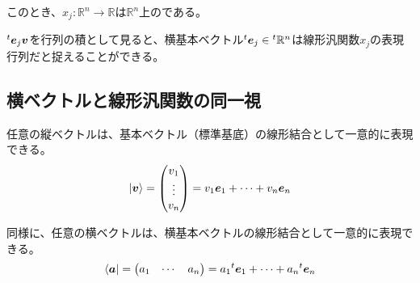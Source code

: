 \documentclass[../../../topic_linear-algebra]{subfiles}
\begin{document}
このとき、$x_j\colon \mathbb{R}^n \to \mathbb{R}$は$\mathbb{R}^n$上のである。

${}^t\vb*{e}_j \vb*{v}$を行列の積として見ると、横基本ベクトル${}^t\vb*{e}_j \in {}^t\mathbb{R}^n$は線形汎関数$x_j$の表現行列だと捉えることができる。

\begin{mindflow}
\end{mindflow}

\subsection{横ベクトルと線形汎関数の同一視}\label{sec:row-vector-functional}

任意の縦ベクトルは、基本ベクトル（標準基底）の線形結合として一意的に表現できる。
\begin{equation*}
  \ket{\vb*{v}} = \begin{pmatrix}
    v_1 \\
    \vdots \\
    v_n
  \end{pmatrix} = v_1 \vb*{e}_1 + \cdots + v_n \vb*{e}_n
\end{equation*}

同様に、任意の横ベクトルは、横基本ベクトルの線形結合として一意的に表現できる。
\begin{equation*}
  \bra{\vb*{a}} = \begin{pmatrix}
    a_1 & \cdots & a_n
  \end{pmatrix}
  = a_1 {}^t\vb*{e}_1 + \cdots + a_n {}^t\vb*{e}_n
\end{equation*}

\br
\end{document}
